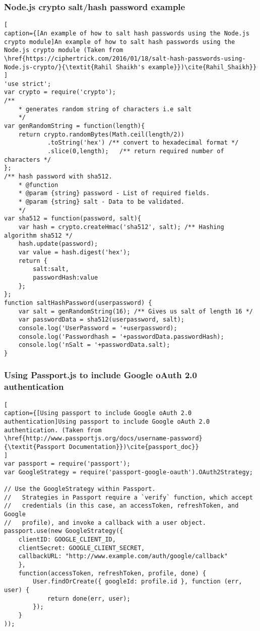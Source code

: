 \subsubsection{Node.js crypto salt/hash password example}
\label{sec:node_crypto}
\begin{lstlisting}[
caption={[An example of how to salt hash passwords using the Node.js crypto module]An example of how to salt hash passwords using the Node.js crypto module (Taken from \href{https://ciphertrick.com/2016/01/18/salt-hash-passwords-using-Node.js-crypto/}{\textit{Rahil Shaikh's example}})\cite{Rahil_Shaikh}}
]
'use strict';
var crypto = require('crypto');
/**
    * generates random string of characters i.e salt
    */
var genRandomString = function(length){
    return crypto.randomBytes(Math.ceil(length/2))
            .toString('hex') /** convert to hexadecimal format */
            .slice(0,length);   /** return required number of characters */
};
/** hash password with sha512.
    * @function
    * @param {string} password - List of required fields.
    * @param {string} salt - Data to be validated.
    */
var sha512 = function(password, salt){
    var hash = crypto.createHmac('sha512', salt); /** Hashing algorithm sha512 */
    hash.update(password);
    var value = hash.digest('hex');
    return {
        salt:salt,
        passwordHash:value
    };
};
function saltHashPassword(userpassword) {
    var salt = genRandomString(16); /** Gives us salt of length 16 */
    var passwordData = sha512(userpassword, salt);
    console.log('UserPassword = '+userpassword);
    console.log('Passwordhash = '+passwordData.passwordHash);
    console.log('nSalt = '+passwordData.salt);
}
\end{lstlisting}
\subsubsection{Using Passport.js to include Google oAuth 2.0 authentication}
\label{sec:passport_oauth}
\begin{lstlisting}[
caption={[Using passport to include Google oAuth 2.0 authentication]Using passport to include Google oAuth 2.0 authentication. (Taken from \href{http://www.passportjs.org/docs/username-password}{\textit{Passport Documentation}})\cite{passport_doc}}
]
var passport = require('passport');
var GoogleStrategy = require('passport-google-oauth').OAuth2Strategy;

// Use the GoogleStrategy within Passport.
//   Strategies in Passport require a `verify` function, which accept
//   credentials (in this case, an accessToken, refreshToken, and Google
//   profile), and invoke a callback with a user object.
passport.use(new GoogleStrategy({
    clientID: GOOGLE_CLIENT_ID,
    clientSecret: GOOGLE_CLIENT_SECRET,
    callbackURL: "http://www.example.com/auth/google/callback"
    },
    function(accessToken, refreshToken, profile, done) {
        User.findOrCreate({ googleId: profile.id }, function (err, user) {
            return done(err, user);
        });
    }
));
\end{lstlisting}    
